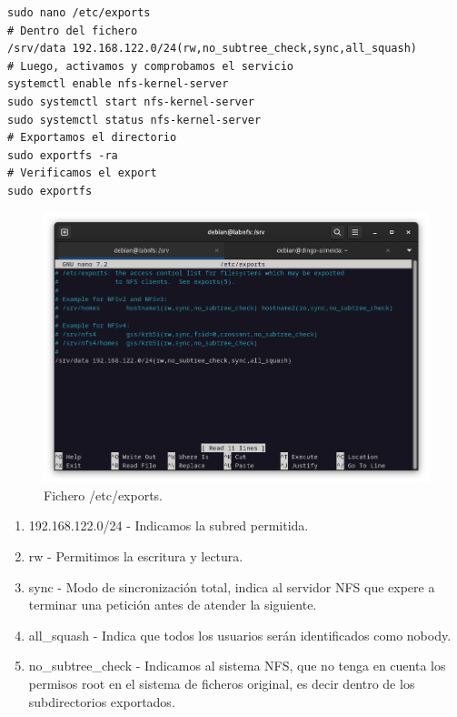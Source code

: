 \begin{lstlisting}[style=mybash]
sudo nano /etc/exports
# Dentro del fichero
/srv/data 192.168.122.0/24(rw,no_subtree_check,sync,all_squash)
# Luego, activamos y comprobamos el servicio
systemctl enable nfs-kernel-server
sudo systemctl start nfs-kernel-server
sudo systemctl status nfs-kernel-server
# Exportamos el directorio
sudo exportfs -ra
# Verificamos el export
sudo exportfs
\end{lstlisting}

\begin{figure}[H]
	\centering
	\includegraphics[scale=0.30]{01}
	\caption{Fichero /etc/exports.}
\end{figure}

\begin{enumerate}
\item 192.168.122.0/24 - Indicamos la subred permitida.
\item rw - Permitimos la escritura y lectura.
\item sync - Modo de sincronización total, indica al servidor NFS que expere a terminar una petición antes de atender la siguiente.
\item all\_squash - Indica que todos los usuarios serán identificados como nobody.
\item no\_subtree\_check - Indicamos al sistema NFS, que no tenga en cuenta los permisos root en el sistema de ficheros original, es decir dentro de los subdirectorios exportados.
\end{enumerate}

